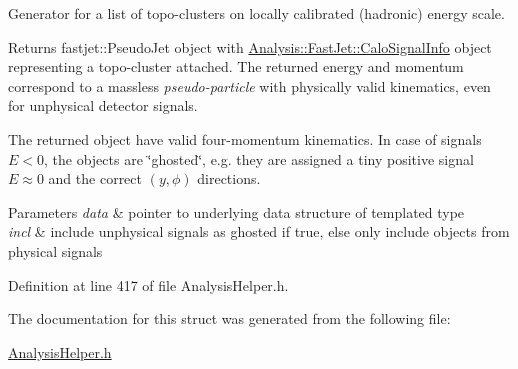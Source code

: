 Generator for a list of topo-\/clusters on locally calibrated (hadronic) energy scale. 

\begin{DoxyReturn}{Returns}
{\ttfamily fastjet\+::\+Pseudo\+Jet} object with {\ttfamily \hyperlink{classAnalysis_1_1FastJet_1_1CaloSignalInfo}{Analysis\+::\+Fast\+Jet\+::\+Calo\+Signal\+Info}} object representing a topo-\/cluster attached. The returned energy and momentum correspond to a massless {\itshape pseudo-\/particle} with physically valid kinematics, even for unphysical detector signals.
\end{DoxyReturn}
The returned object have valid four-\/momentum kinematics. In case of signals $ E < 0 $, the objects are \char`\"{}ghosted\char`\"{}, e.\+g. they are assigned a tiny positive signal $ E \approx 0 $ and the correct $ (y,\phi) $ directions.


\begin{DoxyParams}{Parameters}
{\em data} & pointer to underlying data structure of templated type \\
\hline
{\em incl} & include unphysical signals as ghosted if {\ttfamily true}, else only include objects from physical signals \\
\hline
\end{DoxyParams}


Definition at line 417 of file Analysis\+Helper.\+h.



The documentation for this struct was generated from the following file\+:\begin{DoxyCompactItemize}
\item 
\hyperlink{AnalysisHelper_8h}{Analysis\+Helper.\+h}\end{DoxyCompactItemize}
